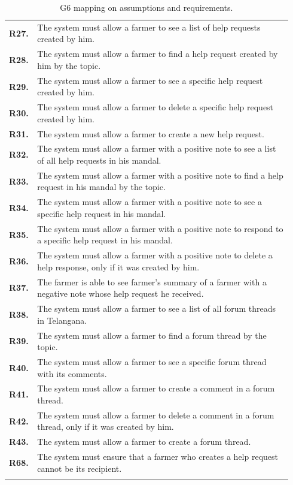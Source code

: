 \begin{longtable}{p{0.06\linewidth} p{0.88\linewidth}}
	\textbf{R27.} & The system must allow a farmer to see a list of help requests created by him.\\
	\textbf{R28.} & The system must allow a farmer to find a help request created by him by the topic.\\
	\textbf{R29.} & The system must allow a farmer to see a specific help request created by him.\\
	\textbf{R30.} & The system must allow a farmer to delete a specific help request created by him.\\
	\textbf{R31.} & The system must allow a farmer to create a new help request.\\
	\textbf{R32.} & The system must allow a farmer with a positive note to see a list of all help requests in his mandal.\\
	\textbf{R33.} & The system must allow a farmer with a positive note to find a help request in his mandal by the topic.\\
	\textbf{R34.} & The system must allow a farmer with a positive note to see a specific help request in his mandal.\\
	\textbf{R35.} & The system must allow a farmer with a positive note to respond to a specific help request in his mandal.\\
	\textbf{R36.} & The system must allow a farmer with a positive note to delete a help response, only if it was created by him.\\
	\textbf{R37.} & The farmer is able to see farmer's summary of a farmer with a negative note whose help request he received. \\
	\textbf{R38.} & The system must allow a farmer to see a list of all forum threads in Telangana.\\
	\textbf{R39.} & The system must allow a farmer to find a forum thread by the topic.\\
	\textbf{R40.} & The system must allow a farmer to see a specific forum thread with its comments.\\
	\textbf{R41.} & The system must allow a farmer to create a comment in a forum thread.\\
	\textbf{R42.} & The system must allow a farmer to delete a comment in a forum thread, only if it was created by him.\\
	\textbf{R43.} & The system must allow a farmer to create a forum thread.\\
	\textbf{R68.} & The system must ensure that a farmer who creates a help request cannot be its recipient.\\
	
    \bottomrule
    \caption{G6 mapping on assumptions and requirements.}
\end{longtable}

